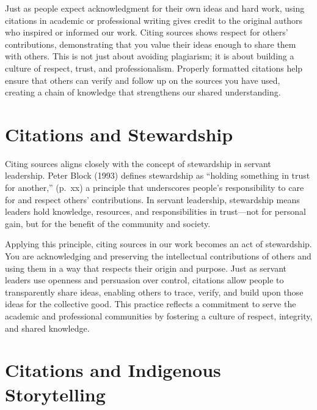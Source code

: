 \documentclass[
  letterpaper,
  DIV=11,
  numbers=noendperiod]{scrreprt}
\begin{document}
Just as people expect acknowledgment for their own ideas and hard work,
using citations in academic or professional writing gives credit to the
original authors who inspired or informed our work. Citing sources shows
respect for others' contributions, demonstrating that you value their
ideas enough to share them with others. This is not just about avoiding
plagiarism; it is about building a culture of respect, trust, and
professionalism. Properly formatted citations help ensure that others
can verify and follow up on the sources you have used, creating a chain
of knowledge that strengthens our shared understanding.

\section*{Citations and Stewardship}\label{citations-and-stewardship}


Citing sources aligns closely with the concept of stewardship in servant
leadership. Peter Block (1993) defines stewardship as ``holding
something in trust for another,'' (p.~xx) a principle that underscores
people's responsibility to care for and respect others' contributions.
In servant leadership, stewardship means leaders hold knowledge,
resources, and responsibilities in trust---not for personal gain, but
for the benefit of the community and society.

Applying this principle, citing sources in our work becomes an act of
stewardship. You are acknowledging and preserving the intellectual
contributions of others and using them in a way that respects their
origin and purpose. Just as servant leaders use openness and persuasion
over control, citations allow people to transparently share ideas,
enabling others to trace, verify, and build upon those ideas for the
collective good. This practice reflects a commitment to serve the
academic and professional communities by fostering a culture of respect,
integrity, and shared knowledge.

\section*{Citations and Indigenous
Storytelling}\label{citations-and-indigenous-storytelling}

\end{document}
